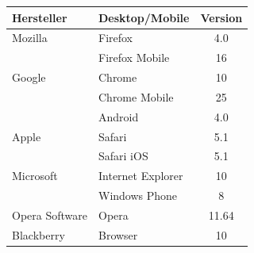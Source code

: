 
\vspace{1em}
\begin{center}
  \begin{tabular}{ | l | l | c | }
    \hline
    \textbf{Hersteller} & \textbf{Desktop/Mobile} & \textbf{Version} \\ \hline \hline
    Mozilla & Firefox & 4.0\\
	\hline
	& Firefox Mobile & 16\\
	\hline
	Google & Chrome & 10\\
	\hline
	& Chrome Mobile & 25\\
	\hline
	& Android & 4.0\\
	\hline
	Apple & Safari & 5.1\\
	\hline
	& Safari iOS & 5.1\\
	\hline
	Microsoft & Internet Explorer & 10\\
	\hline
	& Windows Phone & 8\\
	\hline
	Opera Software & Opera & 11.64\\
	\hline
	Blackberry & Browser & 10\\
    \hline
  \end{tabular}
\label{tab:html5browserkomp}
\end{center}


